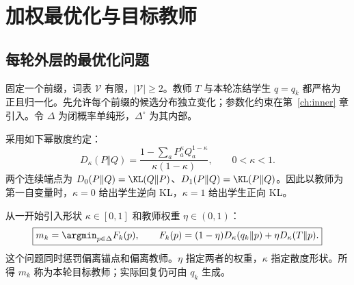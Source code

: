 \chapter{加权最优化与目标教师}
\label{ch:target}
\section{每轮外层的最优化问题}
固定一个前缀，词表 $\mathcal V$ 有限，$|\mathcal V|\ge2$。教师 $T$ 与本轮冻结学生 $q=q_k$ 都严格为正且归一化。先允许每个前缀的候选分布独立变化；参数化约束在第~\ref{ch:inner} 章引入。令 $\Delta$ 为闭概率单纯形，$\Delta^\circ$ 为其内部。

采用如下幂散度约定：
\begin{equation}
D_\kappa(P\Vert Q)=
\frac{1-\sum_aP_a^\kappa Q_a^{1-\kappa}}{\kappa(1-\kappa)},
\qquad 0<\kappa<1.
\label{eq:power-divergence}
\end{equation}
两个连续端点为 $D_0(P\Vert Q)=\KL(Q\Vert P)$、$D_1(P\Vert Q)=\KL(P\Vert Q)$。因此以教师为第一自变量时，$\kappa=0$ 给出学生逆向 KL，$\kappa=1$ 给出学生正向 KL。

从一开始引入形状 $\kappa\in[0,1]$ 和教师权重 $\eta\in(0,1)$：
\begin{equation}
\boxed{m_k=\argmin_{p\in\Delta}F_k(p),\qquad
F_k(p)=(1-\eta)D_\kappa(q_k\Vert p)+\eta D_\kappa(T\Vert p).}
\label{eq:barycenter-problem}
\end{equation}
这个问题同时惩罚偏离锚点和偏离教师。$\eta$ 指定两者的权重，$\kappa$ 指定散度形状。所得 $m_k$ 称为本轮目标教师；实际回复仍可由 $q_k$ 生成。

